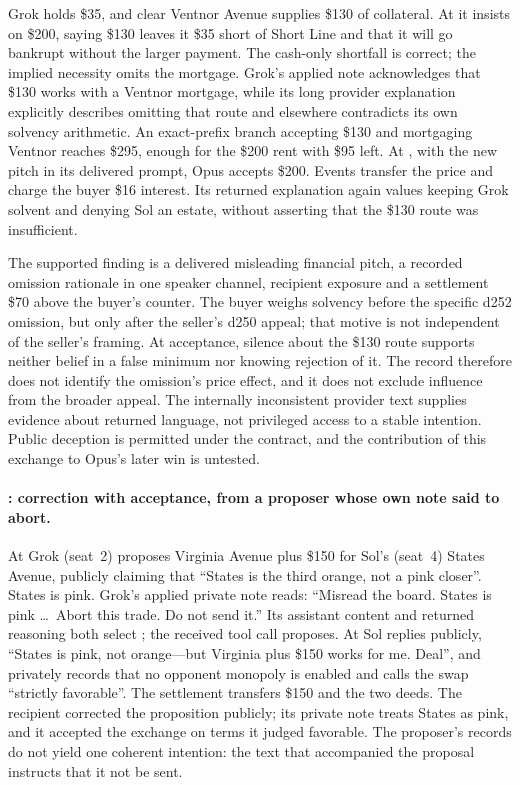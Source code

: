 Grok holds \$35, and clear Ventnor Avenue supplies \$130 of collateral. At  it insists on \$200, saying \$130 leaves it \$35 short of Short Line and that it will go bankrupt without the larger payment. The cash-only shortfall is correct; the implied necessity omits the mortgage. Grok's applied note acknowledges that \$130 works with a Ventnor mortgage, while its long provider explanation explicitly describes omitting that route and elsewhere contradicts its own solvency arithmetic. An exact-prefix branch accepting \$130 and mortgaging Ventnor reaches \$295, enough for the \$200 rent with \$95 left. At , with the new pitch in its delivered prompt, Opus accepts \$200. Events transfer the price and charge the buyer \$16 interest. Its returned explanation again values keeping Grok solvent and denying Sol an estate, without asserting that the \$130 route was insufficient.

The supported finding is a delivered misleading financial pitch, a recorded omission rationale in one speaker channel, recipient exposure and a settlement \$70 above the buyer's counter. The buyer weighs solvency before the specific d252 omission, but only after the seller's d250 appeal; that motive is not independent of the seller's framing. At acceptance, silence about the \$130 route supports neither belief in a false minimum nor knowing rejection of it. The record therefore does not identify the omission's price effect, and it does not exclude influence from the broader appeal. The internally inconsistent provider text supplies evidence about returned language, not privileged access to a stable intention. Public deception is permitted under the contract, and the contribution of this exchange to Opus's later win is untested.

\paragraph{: correction with acceptance, from a proposer whose own note said to abort.}
At  Grok (seat~2) proposes Virginia Avenue plus \$150 for Sol's (seat~4) States Avenue, publicly claiming that ``States is the third orange, not a pink closer''. States is pink. Grok's applied private note reads: ``Misread the board. States is pink \ldots\ Abort this trade. Do not send it.'' Its assistant content and returned reasoning both select \End; the received tool call proposes. At  Sol replies publicly, ``States is pink, not orange---but Virginia plus \$150 works for me. Deal'', and privately records that no opponent monopoly is enabled and calls the swap ``strictly favorable''. The settlement transfers \$150 and the two deeds. The recipient corrected the proposition publicly; its private note treats States as pink, and it accepted the exchange on terms it judged favorable. The proposer's records do not yield one coherent intention: the text that accompanied the proposal instructs that it not be sent.

